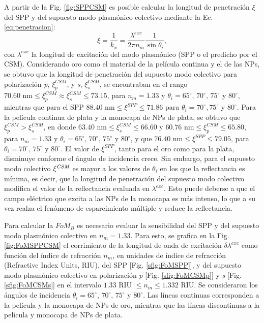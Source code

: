 A partir de la  Fig. \ref{fig:SPPCSM} es posible calcular la longitud de penetración $\xi$ del SPP y del supuesto modo plasmónico colectivo mediante la Ec. \eqref{eq:penetracion}:
%
\begin{equation*}
\xi=\frac{1}{k_x}= \frac{\lambda^{exc}}{2\pi n_m}\frac{1}{\sin\theta_i} ,
\end{equation*}
%
con $\lambda^{exc}$ la longitud de excitación del modo plasmónico (SPP o el predicho por el CSM). Considerando oro como el material de la película continua y el de las NPs, se obtuvo que la longitud de penetración del supuesto modo colectivo para polarización \emph{p}, $\xi^{\textit{CSM}}_p$, y \emph{s}, $\xi^{\textit{CSM}}_s$, se encontraban en el rango $70.60\mbox{ nm}\leq \xi^{\textit{CSM}}_p\approx\xi^{\textit{CSM}}_s\leq 73.15$, para $n_m=1.33$ y $\theta_i=65^\circ,\, 70^\circ,\, 75^\circ$ y $80^\circ$, mientras que para el SPP $88.40\mbox{ nm}\leq \xi^{\textit{SPP}}\leq 71.86$ para $\theta_i= 70^\circ, 75^\circ$ y $80^\circ$. Para la película continua de  plata y la monocapa de NPs de plata, se obtuvo que $\xi^{\textit{CSM}}_p>\xi^{\textit{CSM}}_s$, en donde $63.40\mbox{ nm}\leq \xi^{\textit{CSM}}_s \leq 66.60$ y $60.76\mbox{ nm}\leq \xi^{\textit{CSM}}_p\leq 65.80$, para $n_m=1.33$ y $\theta_i=65^\circ,\, 70^\circ,\, 75^\circ$ y $80^\circ$, y que $76.40\mbox{ nm}\leq \xi^{\textit{SPP}}\leq 79.05$, para $\theta_i= 70^\circ,\, 75^\circ$ y $80^\circ$. El valor de $\xi^{\textit{SPP}}$, tanto para el oro como para la plata, disminuye conforme el ángulo de incidencia crece. Sin embargo, para el supuesto modo colectivo $\xi^{\textit{\textit{CSM}}}$ es mayor a los valores de $\theta_i$ en los que la reflectancia es mínima, es decir, que la longitud de penetración del supuesto modo colectivo modifica el valor de la reflectancia evaluada en $\lambda^{exc}$. Esto puede deberse a que el campo eléctrico que excita a las NPs de la monocapa es más intenso, lo que a su vez realza el fenómeno de esparcimiento múltiple y reduce la reflectancia.

Para calcular la $\textit{FoM}_B$ es necesario evaluar la sensibilidad del SPP y del supuesto modo plasmónico  colectivo en $n_m=1.33$. Para esto, se grafica en la Fig. \ref{fig:FoMSPPCSM} el corrimiento de la longitud de onda de excitación $\delta\lambda^{exc}$ como función del índice de refracción $n_m$, en unidades de índice de refracción (Refractive Index Units, RIU),  del SPP [Fig. \ref{sfig:FoMSPP}], y del supuesto modo  plasmónico colectivo en polarización \emph{p} [Fig. \ref{sfig:FoMCSMp}] y \emph{s} [Fig. \ref{sfig:FoMCSMs}]  en el intervalo $1.33$ RIU $\leq n_m\leq 1.332$ RIU. Se consideraron los ángulos de incidencia $\theta_i=65^\circ,\, 70^\circ,\, 75^\circ$ y $80^\circ$. Las líneas continuas corresponden a la película y la monocapa de NPs de oro, mientras que las líneas discontinuas a la película y monocapa de NPs de plata. 

